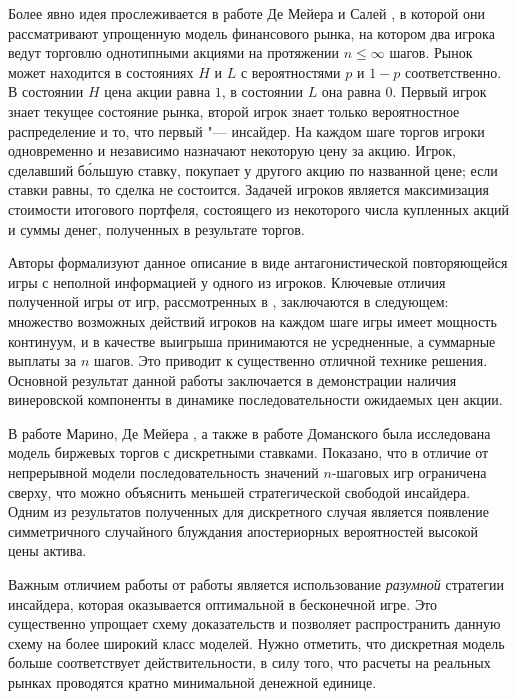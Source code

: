 Более явно идея прослеживается в работе Де Мейера и Салей \cite{demeyer02}, в
которой они рассматривают упрощенную модель финансового рынка, на котором два
игрока ведут торговлю однотипными акциями на протяжении $n \leq \infty$ шагов.
Рынок может находится в состояниях $H$ и $L$ с вероятностями $p$ и $1-p$
соответственно. В состоянии $H$ цена акции равна $1$, в состоянии $L$ она равна
$0$. Первый игрок знает текущее состояние рынка, второй игрок знает только
вероятностное распределение и то, что первый "--- инсайдер. На каждом шаге
торгов игроки одновременно и независимо назначают некоторую цену за акцию.
Игрок, сделавший б\'{о}льшую ставку, покупает у другого акцию по названной цене;
если ставки равны, то сделка не состоится. Задачей игроков является максимизация
стоимости итогового портфеля, состоящего из некоторого числа купленных акций и
суммы денег, полученных в результате торгов.

Авторы формализуют данное описание в виде антагонистической повторяющейся игры с
неполной информацией у одного из игроков. Ключевые отличия полученной игры от
игр, рассмотренных в \cite{aumann95}, заключаются в следующем: множество
возможных действий игроков на каждом шаге игры имеет мощность континуум, и в
качестве выигрыша принимаются не усредненные, а суммарные выплаты за $n$ шагов.
Это приводит к существенно отличной технике решения. Основной результат данной
работы заключается в демонстрации наличия винеровской компоненты в динамике
последовательности ожидаемых цен акции.


В работе Марино, Де Мейера \cite{demeyer05}, а также в работе Доманского
\cite{domansky07} была исследована модель биржевых торгов с дискретными
ставками. Показано, что в отличие от непрерывной модели последовательность
значений $n$-шаговых игр ограничена сверху, что можно объяснить меньшей
стратегической свободой инсайдера. Одним из результатов полученных для
дискретного случая является появление симметричного случайного блуждания
апостериорных вероятностей высокой цены актива.

Важным отличием работы \cite{domansky07} от работы \cite{demeyer05} является
использование \emph{разумной} стратегии инсайдера, которая оказывается
оптимальной в бесконечной игре. Это существенно упрощает схему доказательств и
позволяет распространить данную схему на более широкий класс моделей. Нужно
отметить, что дискретная модель больше соответствует действительности, в силу
того, что расчеты на реальных рынках проводятся кратно минимальной денежной
единице.

